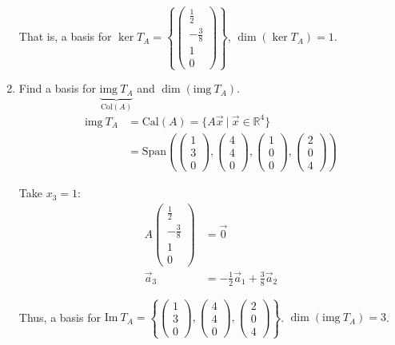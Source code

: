 \documentclass[11pt,fleqn]{book} %
\begin{document}
\begin{example}
\begin{enumerate}
        That is, a basis for $\ker T_A = \left\{ \begin{pmatrix} \frac12 \\ -\frac38 \\ 1 \\ 0 \end{pmatrix} \right\}$, $\dim\left( \ker T_A \right)=1$. 
        
        \item Find a basis for $\underbrace{\mathrm{img}~T_A}_{\mathrm{Col}(A)}$ and $\dim \left( \mathrm{img}~T_A \right)$. 
        \begin{align*}
            \mathrm{img}~T_A 
            &= \mathrm{Cal}(A) = \{ A\vec{x} ~|~ \vec{x} \in \mathbb{R}^4 \}
            \\
            &=\mathrm{Span}\left( \begin{pmatrix} 1\\3\\0 \end{pmatrix}, \begin{pmatrix} 4\\4\\0 \end{pmatrix}, \begin{pmatrix} 1\\0\\0 \end{pmatrix}, \begin{pmatrix} 2\\0\\4 \end{pmatrix} \right)
        \end{align*}
        
        Take $x_3=1$: 
        \begin{align*}
            A \begin{pmatrix} \frac12\\-\frac38\\1\\0 \end{pmatrix}
            &=\vec{0}
            \\
            \vec{a}_3 
            &= -\frac12\vec{a}_1 + \frac38\vec{a}_2
        \end{align*}
        
        Thus, a basis for $\mathrm{Im}~T_A = \left\{ \begin{pmatrix} 1\\3\\0 \end{pmatrix}, \begin{pmatrix} 4\\4\\0 \end{pmatrix}, \begin{pmatrix} 2\\0\\4 \end{pmatrix} \right\}$. $\dim\left( \mathrm{img}~T_A \right) = 3$. 


\end{enumerate}
\end{example}
\end{document}
